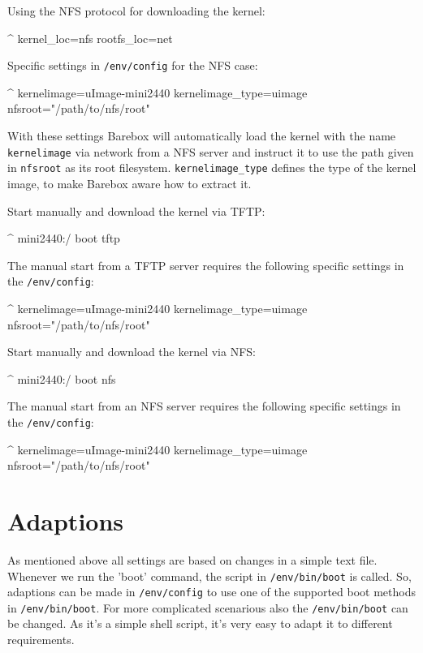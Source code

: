 Using the NFS protocol for downloading the kernel:

\begin{ptxshell}[escapechar=|]{^}
kernel_loc=nfs
rootfs_loc=net
\end{ptxshell}

Specific settings in \texttt{/env/config} for the NFS case:

\begin{ptxshell}[escapechar=|]{^}
kernelimage=uImage-mini2440
kernelimage_type=uimage
nfsroot="/path/to/nfs/root"
\end{ptxshell}

With these settings Barebox will automatically load the kernel with the name
\texttt{kernelimage} via network from a NFS server and instruct it to use
the path given in \texttt{nfsroot} as its root filesystem.
\texttt{kernelimage\_type} defines the type of the kernel image, to make
Barebox aware how to extract it.

Start manually and download the kernel via TFTP:

\begin{ptxshell}[escapechar=|]{^}
mini2440:/ boot tftp
\end{ptxshell}

The manual start from a TFTP server requires the following specific settings
in the \texttt{/env/config}:

\begin{ptxshell}[escapechar=|]{^}
kernelimage=uImage-mini2440
kernelimage_type=uimage
nfsroot="/path/to/nfs/root"
\end{ptxshell}

Start manually and download the kernel via NFS:

\begin{ptxshell}[escapechar=|]{^}
mini2440:/ boot nfs
\end{ptxshell}

The manual start from an NFS server requires the following specific settings
in the \texttt{/env/config}:

\begin{ptxshell}[escapechar=|]{^}
kernelimage=uImage-mini2440
kernelimage_type=uimage
nfsroot="/path/to/nfs/root"
\end{ptxshell}

\section{Adaptions}

As mentioned above all settings are based on changes in a simple text file.
Whenever we run the 'boot' command, the script in \texttt{/env/bin/boot} is
called. So, adaptions can be made in \texttt{/env/config} to use one of the
supported boot methods in \texttt{/env/bin/boot}. For more complicated
scenarious also the \texttt{/env/bin/boot} can be changed. As it's a simple
shell script, it's very easy to adapt it to different requirements.

